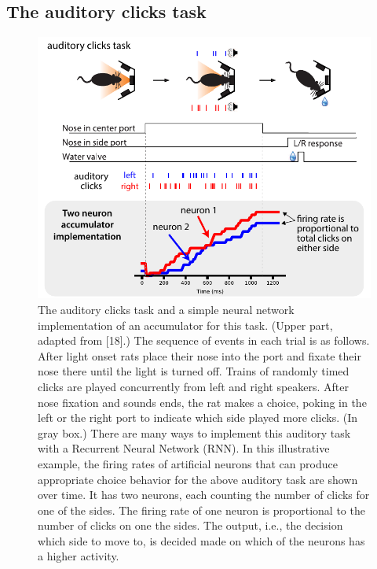 \documentclass{article}
\newcounter{ct}
\theoremstyle{definition}
\theoremstyle{remark}
\begin{document}
\subsection{The auditory clicks task}
\begin{figure}[H]
    \centering
    \includegraphics{figures/task_pi_v1.pdf}
    \caption{The auditory clicks task and a simple neural network implementation of an accumulator for this task.
    (Upper part, adapted from [18].) %
    The sequence of events in each trial is as follows. 
    After light onset rats place their nose into the port and fixate their nose there until the light is turned off. 
    Trains of randomly timed clicks are played concurrently from left and right speakers.
    After nose fixation and sounds ends, the rat makes a choice, poking in the left or the right port to indicate which side played more clicks.
    (In gray box.) There are many ways to implement this auditory task with a Recurrent Neural Network (RNN). In this illustrative example, the firing rates of artificial neurons that can produce appropriate choice behavior for the above auditory task are shown over time. It has two neurons, each counting the number of clicks for one of the sides. The firing rate of one neuron is proportional to the number of clicks on one the sides. The output, i.e., the decision which side to move to, is decided made on which of the neurons has a higher activity.  }%
    \label{fig:task_pi_v1}
\end{figure}
\end{document}
